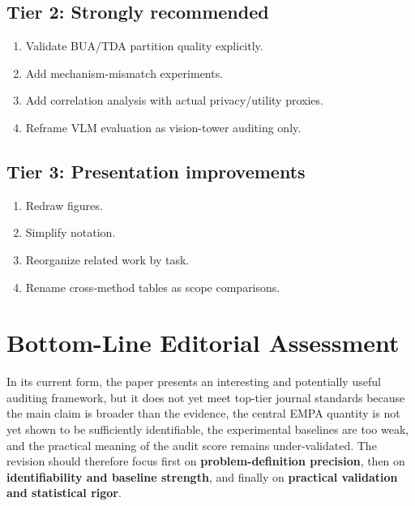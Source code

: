 \subsection*{Tier 2: Strongly recommended}
\begin{enumerate}
    \item Validate BUA/TDA partition quality explicitly.
    \item Add mechanism-mismatch experiments.
    \item Add correlation analysis with actual privacy/utility proxies.
    \item Reframe VLM evaluation as vision-tower auditing only.
\end{enumerate}

\subsection*{Tier 3: Presentation improvements}
\begin{enumerate}
    \item Redraw figures.
    \item Simplify notation.
    \item Reorganize related work by task.
    \item Rename cross-method tables as scope comparisons.
\end{enumerate}

\section*{Bottom-Line Editorial Assessment}

In its current form, the paper presents an interesting and potentially useful auditing framework, but it does not yet meet top-tier journal standards because the main claim is broader than the evidence, the central EMPA quantity is not yet shown to be sufficiently identifiable, the experimental baselines are too weak, and the practical meaning of the audit score remains under-validated. The revision should therefore focus first on \textbf{problem-definition precision}, then on \textbf{identifiability and baseline strength}, and finally on \textbf{practical validation and statistical rigor}.